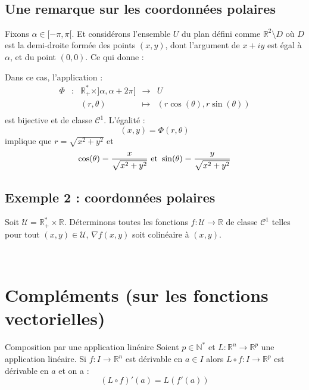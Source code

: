 \documentclass[french,11pt,twoside]{VcCours}
\begin{document}
\newpage

$\phantom{}$
\vspace{10cm}


\subsection{Une remarque sur les coordonnées polaires}
Fixons $\alpha \in [-\pi,\pi[$. Et considérons l'ensemble $U$ du plan défini comme $\mathbb{R}^2 \setminus D$ où $D$ est la demi-droite formée des points $(x,y)$, dont l'argument de $x+iy$ est égal à $\alpha$, et du point $(0,0)$. Ce qui donne :

\vspace{3cm}

Dans ce cas, l'application :
$$ \begin{array}{cccll}
\Phi & : & \mathbb{R}_+^{*} \times ]\alpha, \alpha + 2 \pi[ & \rightarrow & U \\
& & (r, \theta) & \mapsto & (r \cos(\theta), r \sin(\theta)) \\
\end{array}$$
est bijective et de classe $\mathcal{C}^1$. L'égalité :
$$ (x,y) = \Phi(r ,\theta)$$ implique que $r= \sqrt{x^2+y^2}$ et 
$$ \cos(\theta) = \dfrac{x}{\sqrt{x^2+y^2}} \hbox{ et } \sin(\theta) = \dfrac{y}{\sqrt{x^2+y^2}} $$

\subsection{Exemple 2 : coordonnées polaires}
Soit $\mathcal{U} = \mathbb{R}_+^{*} \times \mathbb{R}$. Déterminons toutes les fonctions $f : \mathcal{U} \rightarrow \mathbb{R}$ de classe $\mathcal{C}^1$ telles pour tout $(x,y) \in \mathcal{U}$, $\nabla f (x,y)$ soit colinéaire à $(x,y)$.
\newpage

$\phantom{test}$

\vspace{10cm}

\section{Compléments (sur les fonctions vectorielles)}

\begin{Proposition}{Composition par une application linéaire}
Soient $p \in \mathbb{N}^*$ et $L : \mathbb{R}^n \rightarrow \mathbb{R}^p$ une application linéaire. Si $f : I \rightarrow \mathbb{R}^n$ est dérivable en $a \in I$ alors $L \circ f : I \rightarrow \mathbb{R}^p$ est dérivable en $a$ et on a :
$$ (L \circ f)'(a) = L (f'(a))$$
\end{Proposition}
\end{document}
